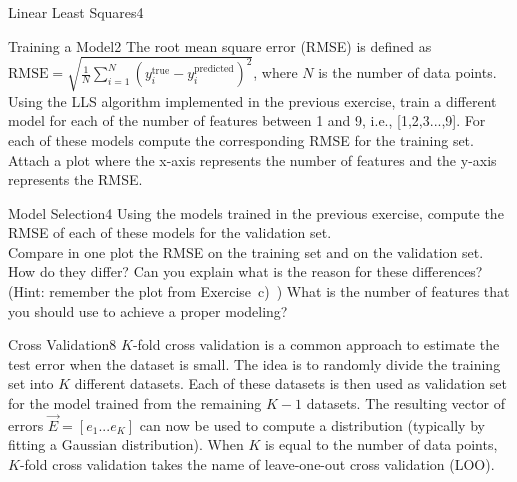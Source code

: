 \begin{questions}
\begin{question}{Linear Least Squares}{4}
\begin{answer}\end{answer}
		
	\end{question}
	
	
	
	\begin{question}{Training a Model}{2}
		The root mean square error (RMSE) is defined as $\text{RMSE} = \sqrt{\frac{1}{N}\sum_{i=1}^{N}(y^{\text{true}}_i-y^{\text{predicted}}_i)^{2}}$, where $N$ is the number of data points. 
		Using the LLS algorithm implemented in the previous exercise, train a different model for each of the number of features between 1 and 9, i.e.,  [1,2,3...,9].
		For each of these models compute the corresponding RMSE for the training set. 
		Attach a plot where the x-axis represents the number of features and the y-axis represents the RMSE.
		
\begin{answer}\end{answer}
		
	\end{question}
	
	
	
	\begin{question}{Model Selection}{4}
		Using the models trained in the previous exercise, compute the RMSE of each of these models for the validation set.\\
		Compare in one plot the RMSE on the training set and on the validation set. 
		How do they differ? 
		Can you explain what is the reason for these differences? (Hint: remember the plot from Exercise~c)~) 
		What is the number of features that you should use to achieve a proper modeling?
		
\begin{answer}\end{answer}
	\end{question}
	
	
	\begin{question}{Cross Validation}{8}
		$K$-fold cross validation is a common approach to estimate the test error when the dataset is small.
		The idea is to randomly divide the training set into $K$ different datasets.
		Each of these datasets is then used as validation set for the model trained from the remaining $K-1$ datasets.
		The resulting vector of errors $\vec E = [ e_1... e_K ]$ can now be used to compute a distribution (typically by fitting a Gaussian distribution).
		When $K$ is equal to the number of data points, $K$-fold cross validation takes the name of leave-one-out cross validation (LOO).
		

\end{question}
\end{questions}
